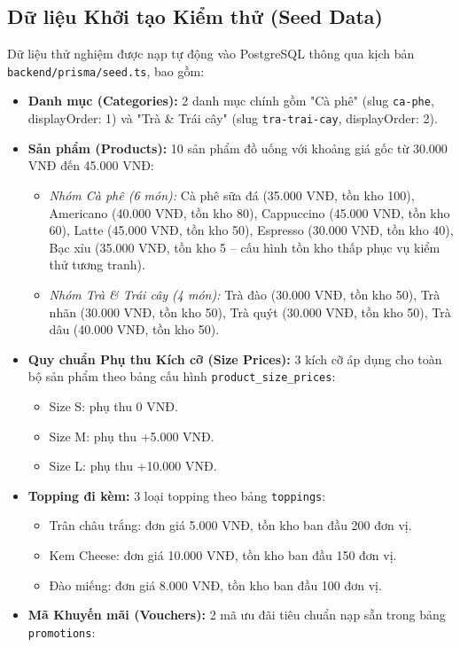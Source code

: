 \documentclass[12pt,a4paper,oneside]{report}
\begin{document}
\subsection{Dữ liệu Khởi tạo Kiểm thử (Seed Data)}
Dữ liệu thử nghiệm được nạp tự động vào PostgreSQL thông qua kịch bản \texttt{backend/prisma/seed.ts}, bao gồm:
\begin{itemize}
    \item \textbf{Danh mục (Categories):} 2 danh mục chính gồm "Cà phê" (slug \texttt{ca-phe}, displayOrder: 1) và "Trà \& Trái cây" (slug \texttt{tra-trai-cay}, displayOrder: 2).
    \item \textbf{Sản phẩm (Products):} 10 sản phẩm đồ uống với khoảng giá gốc từ 30.000 VNĐ đến 45.000 VNĐ:
    \begin{itemize}
        \item \textit{Nhóm Cà phê (6 món):} Cà phê sữa đá (35.000 VNĐ, tồn kho 100), Americano (40.000 VNĐ, tồn kho 80), Cappuccino (45.000 VNĐ, tồn kho 60), Latte (45.000 VNĐ, tồn kho 50), Espresso (30.000 VNĐ, tồn kho 40), Bạc xỉu (35.000 VNĐ, tồn kho 5 -- cấu hình tồn kho thấp phục vụ kiểm thử tương tranh).
        \item \textit{Nhóm Trà \& Trái cây (4 món):} Trà đào (30.000 VNĐ, tồn kho 50), Trà nhãn (30.000 VNĐ, tồn kho 50), Trà quýt (30.000 VNĐ, tồn kho 50), Trà dâu (40.000 VNĐ, tồn kho 50).
    \end{itemize}
    \item \textbf{Quy chuẩn Phụ thu Kích cỡ (Size Prices):} 3 kích cỡ áp dụng cho toàn bộ sản phẩm theo bảng cấu hình \texttt{product\_size\_prices}:
    \begin{itemize}
        \item Size S: phụ thu 0 VNĐ.
        \item Size M: phụ thu +5.000 VNĐ.
        \item Size L: phụ thu +10.000 VNĐ.
    \end{itemize}
    \item \textbf{Topping đi kèm:} 3 loại topping theo bảng \texttt{toppings}:
    \begin{itemize}
        \item Trân châu trắng: đơn giá 5.000 VNĐ, tồn kho ban đầu 200 đơn vị.
        \item Kem Cheese: đơn giá 10.000 VNĐ, tồn kho ban đầu 150 đơn vị.
        \item Đào miếng: đơn giá 8.000 VNĐ, tồn kho ban đầu 100 đơn vị.
    \end{itemize}
    \item \textbf{Mã Khuyến mãi (Vouchers):} 2 mã ưu đãi tiêu chuẩn nạp sẵn trong bảng \texttt{promotions}:

\end{itemize}
\end{document}
